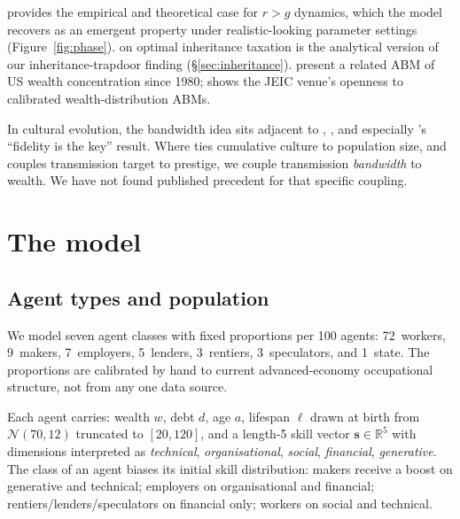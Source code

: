 \documentclass[11pt]{article}
\begin{document}
\citet{piketty2014capital} provides the empirical and theoretical case
for $r > g$ dynamics, which the model recovers as an emergent property
under realistic-looking parameter settings (Figure~\ref{fig:phase}).
\citet{piketty2013theory} on optimal inheritance taxation is the
analytical version of our inheritance-trapdoor finding
(\S\ref{sec:inheritance}). \citet{berman2016modeling} present a related
ABM of US wealth concentration since 1980; \citet{pagliarini2017agent}
shows the JEIC venue's openness to calibrated wealth-distribution ABMs.

In cultural evolution, the bandwidth idea sits adjacent to
\citet{boyd1985culture}, \citet{henrich2015secret}, and especially
\citet{lewis2012transmission}'s ``fidelity is the key'' result. Where
\citet{henrich2004demography} ties cumulative culture to population
size, and \citet{henrich2001evolution} couples transmission target to
prestige, we couple transmission \emph{bandwidth} to wealth. We have
not found published precedent for that specific coupling.

\section{The model}
\label{sec:model}

\subsection{Agent types and population}

We model seven agent classes with fixed proportions per 100 agents:
72~workers, 9~makers, 7~employers, 5~lenders, 3~rentiers, 3~speculators,
and 1~state. The proportions are calibrated by hand to current
advanced-economy occupational structure, not from any one data source.

Each agent carries: wealth $w$, debt $d$, age $a$, lifespan
$\ell$ drawn at birth from $\mathcal{N}(70,12)$ truncated to $[20,120]$,
and a length-5 skill vector
$\mathbf{s} \in \mathbb{R}^5$ with dimensions interpreted as
\emph{technical}, \emph{organisational}, \emph{social}, \emph{financial},
\emph{generative}. The class of an agent biases its initial skill
distribution: makers receive a boost on generative and technical;
employers on organisational and financial; rentiers/lenders/speculators
on financial only; workers on social and technical.
\end{document}
